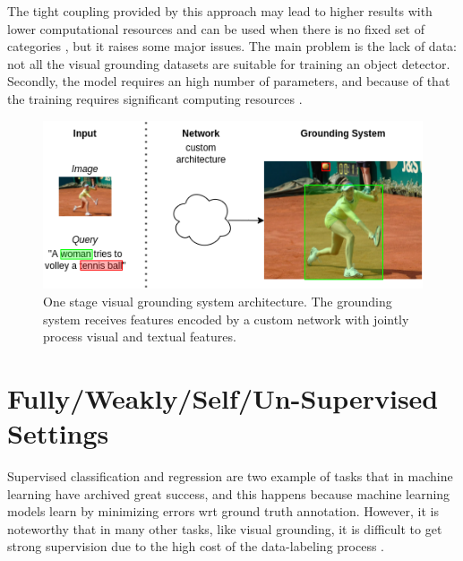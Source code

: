 The tight coupling provided by this approach may lead to higher
results with lower computational resources \cite{yang2019fast} and can
be used when there is no fixed set of categories \cite{sadhu2019zero},
but it raises some major issues. The main problem is the lack of data:
not all the visual grounding datasets are suitable for training an
object detector. Secondly, the model requires an high number of
parameters, and because of that the training requires significant
computing resources \cite{rigoni2021better}.

\begin{figure}
  \centering
  \includegraphics[width=.8\textwidth]{figures/one-stage-approach.png}
  \caption[One stage visual grounding system architecture]{
    One stage visual grounding system architecture. The grounding
    system receives features encoded by a custom network with jointly
    process visual and textual features. }
  \label{fig:one-stage-approach}
\end{figure}

\section{Fully/Weakly/Self/Un-Supervised Settings}
\label{sec:supervision}

Supervised classification and regression are two example of tasks that
in machine learning have archived great success, and this happens
because machine learning models learn by minimizing errors wrt ground
truth annotation. However, it is noteworthy that in many other tasks,
like visual grounding, it is difficult to get strong supervision due
to the high cost of the data-labeling process \cite{zhou2018brief}.

